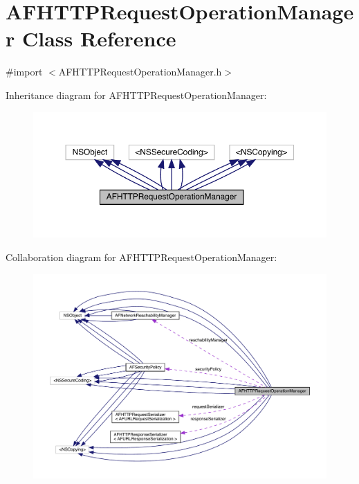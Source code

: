 \hypertarget{interface_a_f_h_t_t_p_request_operation_manager}{}\section{A\+F\+H\+T\+T\+P\+Request\+Operation\+Manager Class Reference}
\label{interface_a_f_h_t_t_p_request_operation_manager}


{\ttfamily \#import $<$A\+F\+H\+T\+T\+P\+Request\+Operation\+Manager.\+h$>$}



Inheritance diagram for A\+F\+H\+T\+T\+P\+Request\+Operation\+Manager\+:\nopagebreak
\begin{figure}[H]
\begin{center}
\leavevmode
\includegraphics[width=350pt]{interface_a_f_h_t_t_p_request_operation_manager__inherit__graph}
\end{center}
\end{figure}


Collaboration diagram for A\+F\+H\+T\+T\+P\+Request\+Operation\+Manager\+:\nopagebreak
\begin{figure}[H]
\begin{center}
\leavevmode
\includegraphics[width=350pt]{interface_a_f_h_t_t_p_request_operation_manager__coll__graph}
\end{center}
\end{figure}
